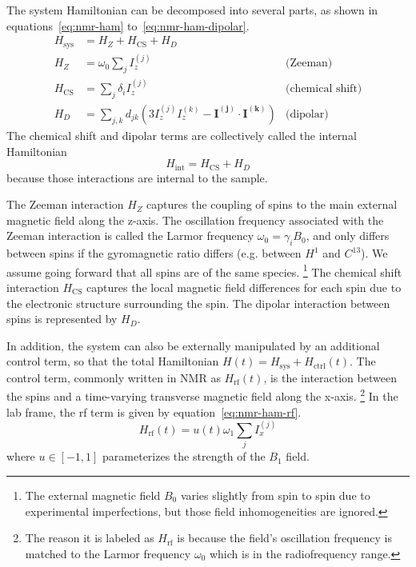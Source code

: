 The system Hamiltonian can be decomposed into several parts, as shown in equations~\ref{eq:nmr-ham} to~\ref{eq:nmr-ham-dipolar}.
\begin{align}\label{eq:nmr-ham}
    H_{\text{sys}} &= H_Z + H_\text{CS} + H_D \\
    H_Z &= \omega_0 \sum_j I_z^{(j)} & \text{(Zeeman)} \\
    H_\text{CS} &= \sum_j \delta_i I_z^{(j)} & \text{(chemical shift)} \\
    \label{eq:nmr-ham-dipolar}
    H_D &= \sum_{j,k} d_{jk} \left( 3I_z^{(j)}I_z^{(k)} - \mathbf{I^{(j)}} \cdot \mathbf{I^{(k)}} \right)& \text{(dipolar)}
\end{align}
The chemical shift and dipolar terms are collectively called the internal Hamiltonian
\begin{equation}
    H_{\text{int}} = H_\text{CS} + H_D
\end{equation}
because those interactions are internal to the sample.

The Zeeman interaction $H_Z$ captures the coupling of spins to the main external magnetic field along the z-axis. The oscillation frequency associated with the Zeeman interaction is called the Larmor frequency $\omega_0 = \gamma_i B_0$, and only differs between spins if the gyromagnetic ratio differs (e.g. between $H^1$ and $C^{13}$). We assume going forward that all spins are of the same species.%
\footnote{The external magnetic field $B_0$ varies slightly from spin to spin due to experimental imperfections, but those field inhomogeneities are ignored.}
The chemical shift interaction $H_{\text{CS}}$ captures the local magnetic field differences for each spin due to the electronic structure surrounding the spin. The dipolar interaction between spins is represented by $H_D$.


In addition, the system can also be externally manipulated by an additional control term, so that the total Hamiltonian $H(t) = H_{\text{sys}} + H_\text{ctrl}(t)$.
The control term, commonly written in NMR as $H_\text{rf}(t)$, is the interaction between the spins and a time-varying transverse magnetic field along the x-axis.%
\footnote{The reason it is labeled as $H_\text{rf}$ is because the field's oscillation frequency is matched to the Larmor frequency $\omega_0$ which is in the radiofrequency range.}
In the lab frame, the rf term is given by equation~\ref{eq:nmr-ham-rf}.
\begin{equation}
    \label{eq:nmr-ham-rf}
    H_{\text{rf}}(t) =  u(t) \omega_1 \sum_j I_x^{(j)}
\end{equation}
where $u \in [-1,1]$ parameterizes the strength of the $B_1$ field.

